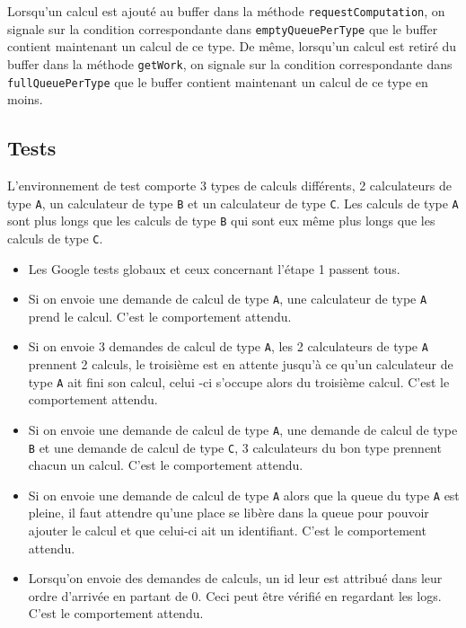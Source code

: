 \documentclass{article}
\begin{document}
Lorsqu'un calcul est ajouté au buffer dans la méthode \texttt{requestComputation}, on signale sur la condition correspondante
dans \texttt{emptyQueuePerType} que le buffer contient maintenant un calcul de ce type. De même, lorsqu'un calcul est
retiré du buffer dans la méthode \texttt{getWork}, on signale sur la condition correspondante dans \texttt{fullQueuePerType}
que le buffer contient maintenant un calcul de ce type en moins.

\subsection{Tests}
L'environnement de test comporte 3 types de calculs différents, 2 calculateurs de type \texttt{A}, un
calculateur de type \texttt{B} et un calculateur de type \texttt{C}. Les calculs de type \texttt{A} sont plus longs
que les calculs de type \texttt{B} qui sont eux même plus longs que les calculs de type \texttt{C}.

\pagebreak

\begin{itemize}
    \item Les Google tests globaux et ceux concernant l'étape 1 passent tous.
    \item Si on envoie une demande de calcul de type \texttt{A}, une calculateur de type \texttt{A} prend le calcul.
    C'est le comportement attendu.
    \item Si on envoie 3 demandes de calcul de type \texttt{A}, les 2 calculateurs de type \texttt{A} prennent 2
    calculs, le troisième est en attente jusqu'à ce qu'un calculateur de type \texttt{A} ait fini son calcul, celui
    -ci s'occupe alors du troisième calcul. C'est le comportement attendu.
    \item Si on envoie une demande de calcul de type \texttt{A}, une demande de calcul de type \texttt{B} et une
    demande de calcul de type \texttt{C}, 3 calculateurs du bon type prennent chacun un calcul. C'est le comportement attendu.
    \item Si on envoie une demande de calcul de type \texttt{A} alors que la queue du type \texttt{A} est pleine, il
    faut attendre qu'une place se libère dans la queue pour pouvoir ajouter le calcul et que celui-ci ait un
    identifiant. C'est le comportement attendu.
    \item Lorsqu'on envoie des demandes de calculs, un id leur est attribué dans leur ordre d'arrivée en partant de
    0. Ceci peut être vérifié en regardant les logs. C'est le comportement attendu.
\end{itemize}
\end{document}
